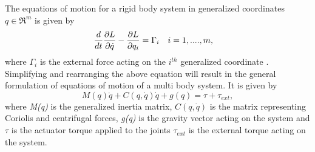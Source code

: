 The equations of motion for a rigid body system in generalized coordinates $q \in \Re^m $ is given by
\begin{align}
\frac{d}{dt} &\frac{\partial {L}}{\partial {\dot{q}}} - \frac{\partial {L}}{\partial {q_i}} = \Gamma_i && i=1,....,m,
\end{align}
where $\Gamma_i$ is the external force acting on the $i^{th}$ generalized coordinate \cite[Chapter 4]{mur94}.
Simplifying and rearranging the above equation will result in the general formulation of equations of motion of a multi body system. It is given by
\begin{equation}
\label{eq:dyn_mul_bdy}
M(q)\ddot{q}+C(q,\dot{q})\dot{q}+g(q) = \tau + \tau_{ext},
\end{equation}
where \emph{M(q)} is the generalized inertia matrix, $C(q,\dot{q})$ is the matrix representing Coriolis and centrifugal forces, \emph{g(q)} is the gravity vector acting on the system and $\tau$ is the actuator torque applied to the joints $\tau_{ext}$ is the external torque acting on the system.


